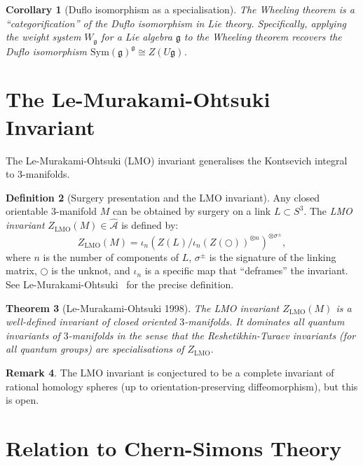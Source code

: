 \documentclass[12pt,a4paper]{amsart}
\newtheorem{theorem}{Theorem}[section]
\newtheorem{corollary}[theorem]{Corollary}
\theoremstyle{definition}
\newtheorem{definition}[theorem]{Definition}
\newtheorem{remark}[theorem]{Remark}
\begin{document}
\begin{corollary}[Duflo isomorphism as a specialisation]
The Wheeling theorem is a ``categorification'' of the Duflo isomorphism in Lie
theory.  Specifically, applying the weight system $W_{\mathfrak{g}}$ for a
Lie algebra $\mathfrak{g}$ to the Wheeling theorem recovers the Duflo
isomorphism $\mathrm{Sym}(\mathfrak{g})^{\mathfrak{g}} \cong Z(U\mathfrak{g})$.
\end{corollary}

\section{The Le-Murakami-Ohtsuki Invariant}\label{sec:LMO}

The Le-Murakami-Ohtsuki (LMO) invariant generalises the Kontsevich integral
to $3$-manifolds.

\begin{definition}[Surgery presentation and the LMO invariant]
Any closed orientable $3$-manifold $M$ can be obtained by surgery on a link
$L \subset S^3$.  The \emph{LMO invariant} $Z_{\mathrm{LMO}}(M) \in \hat{\mathcal{A}}$
is defined by:
\[
  Z_{\mathrm{LMO}}(M) = \iota_n\left(Z(L) / \iota_n(Z(\bigcirc))^{\otimes n}\right)^{\otimes \sigma^\pm},
\]
where $n$ is the number of components of $L$, $\sigma^\pm$ is the signature
of the linking matrix, $\bigcirc$ is the unknot, and $\iota_n$ is a specific
map that ``deframes'' the invariant.  See Le-Murakami-Ohtsuki~\cite{lmo1998}
for the precise definition.
\end{definition}

\begin{theorem}[Le-Murakami-Ohtsuki 1998]\label{thm:LMO}
The LMO invariant $Z_{\mathrm{LMO}}(M)$ is a well-defined invariant of
closed oriented $3$-manifolds.  It dominates all quantum invariants of
$3$-manifolds in the sense that the Reshetikhin-Turaev invariants (for all
quantum groups) are specialisations of $Z_{\mathrm{LMO}}$.
\end{theorem}

\begin{remark}
The LMO invariant is conjectured to be a complete invariant of rational
homology spheres (up to orientation-preserving diffeomorphism), but this
is open.
\end{remark}

\section{Relation to Chern-Simons Theory}\label{sec:chern}
\end{document}
